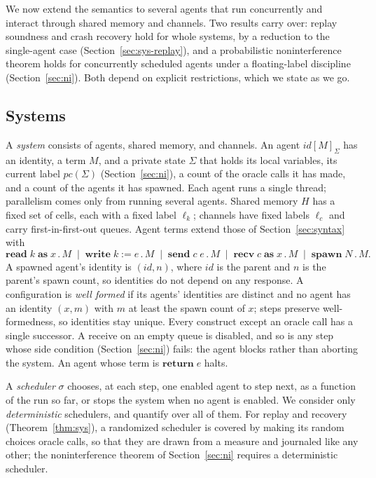 
We now extend the semantics to several agents that run concurrently and interact through
shared memory and channels.
Two results carry over: replay soundness and crash recovery hold for whole systems, by a
reduction to the single-agent case (Section~\ref{sec:sys-replay}), and a probabilistic
noninterference theorem holds for concurrently scheduled agents under a floating-label
discipline (Section~\ref{sec:ni}).
Both depend on explicit restrictions, which we state as we go.

\subsection{Systems}
\label{sec:systems}

A \emph{system} consists of agents, shared memory, and channels.
An agent $\mathit{id}[M]_\Sigma$ has an identity, a term $M$, and a private state $\Sigma$ that
holds its local variables, its current label $\mathit{pc}(\Sigma)$
(Section~\ref{sec:ni}), a count of the oracle calls it has made, and a count of the agents it
has spawned.
Each agent runs a single thread; parallelism comes only from running several agents.
Shared memory $H$ has a fixed set of cells, each with a fixed label $\ell_k$; channels have
fixed labels $\ell_c$ and carry first-in-first-out queues.
Agent terms extend those of Section~\ref{sec:syntax} with
\[
  \mathbf{read}\;k\;\mathbf{as}\;x\,.\,M \;\mid\;
  \mathbf{write}\;k := e\,.\,M \;\mid\;
  \mathbf{send}\;c\;e\,.\,M \;\mid\;
  \mathbf{recv}\;c\;\mathbf{as}\;x\,.\,M \;\mid\;
  \mathbf{spawn}\;N\,.\,M .
\]
A spawned agent's identity is $(\mathit{id}, n)$, where $\mathit{id}$ is the parent and $n$ is
the parent's spawn count, so identities do not depend on any response.
A configuration is \emph{well formed} if its agents' identities are distinct and no agent has
an identity $(x, m)$ with $m$ at least the spawn count of $x$; steps preserve well-formedness,
so identities stay unique.
Every construct except an oracle call has a single successor.
A receive on an empty queue is disabled, and so is any step whose side condition
(Section~\ref{sec:ni}) fails: the agent blocks rather than aborting the system.
An agent whose term is $\mathbf{return}\;e$ halts.

A \emph{scheduler} $\sigma$ chooses, at each step, one enabled agent to step next, as a function
of the run so far, or stops the system when no agent is enabled.
We consider only \emph{deterministic} schedulers, and quantify over all of them.
For replay and recovery (Theorem~\ref{thm:sys}), a randomized scheduler is covered by making its
random choices oracle calls, so that they are drawn from a measure and journaled like any
other; the noninterference theorem of Section~\ref{sec:ni} requires a deterministic scheduler.


